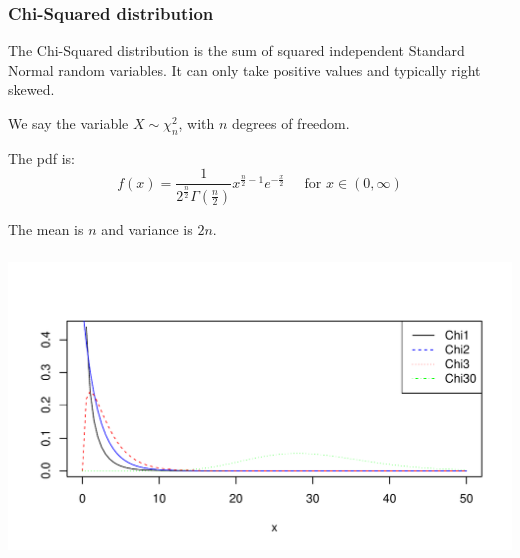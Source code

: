 \documentclass[t,xcolor=pdftex,dvipsnames,table]{beamer}\usepackage[]{graphicx}\usepackage[]{color}
\makeatletter
\def\maxwidth{ %
  \ifdim\Gin@nat@width>\linewidth
    \linewidth
  \else
    \Gin@nat@width
  \fi
}
\newenvironment{knitrout}{}{} %
\makeatother
\begin{document}
\begin{frame}\frametitle{Chi-Squared distribution}

\vspace{.5cm}
\begin{definition}
The \alert{Chi-Squared distribution} is the sum of squared independent Standard Normal random variables. It can only take positive values and typically right skewed.

\vspace{.5cm}
We say the variable $X \sim \chi^2_{n}$, with $n$ degrees of freedom.

\vspace{.5cm}
The pdf is:
\[ f(x)  =  \frac{ 1}  { 2^{\frac{n}{2}} \Gamma(\frac{n}{2})}
x^{\frac{n}{2}-1} e^{-\frac{x}{2}}
\;\;\;\;\; \mbox{for }  x \in (0, \infty) \]

\vspace{.5cm}
The mean is $n$ and variance is $2 n$.
\end{definition}

\end{frame}



\begin{frame}[fragile]\frametitle{}
\begin{knitrout}
\color{fgcolor}
\includegraphics[width=\maxwidth]{figure/unnamed-chunk-98-1} 

\end{knitrout}

\end{frame}
\end{document}
